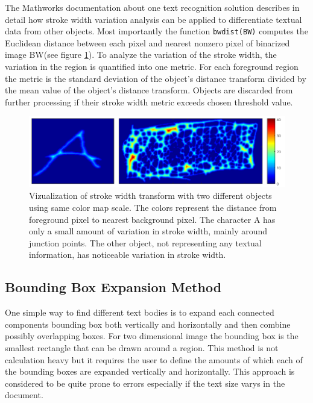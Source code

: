 \documentclass{article}
\def\code#1{\texttt{#1}}
\begin{document}
          The Mathworks documentation about one text recognition solution describes in detail how stroke width variation analysis can be applied to differentiate textual data from other objects. \cite{MathworksTextRecognition} Most importantly the function \code{bwdist(BW)} computes the Euclidean distance between each pixel and nearest nonzero pixel of binarized image BW(see figure \ref{fig:strokewidth}). To analyze the variation of the stroke width, the variation in the region is quantified into one metric. For each foreground region the metric is the standard deviation of the object's distance transform divided by the mean value of the object's distance transform. Objects are discarded from further processing if their stroke width metric exceeds chosen threshold value.

          \begin{figure}
            \centering
            \includegraphics[natwidth=863,natheight=239,scale=0.5]{strokecomparison.png}
            \caption{Vizualization of stroke width transform with two different objects using same color map scale. The colors represent the distance from foreground pixel to nearest background pixel. The character A has only a small amount of variation in stroke width, mainly around junction points. The other object, not representing any textual information, has noticeable variation in stroke width. \label{fig:strokewidth} }
          \end{figure}

        \subsection{Bounding Box Expansion Method}
          One simple way to find different text bodies is to expand each connected components bounding box both vertically and horizontally and then combine possibly overlapping boxes. For two dimensional image the bounding box is the smallest rectangle that can be drawn around a region. This method is not calculation heavy but it requires the user to define the amounts of which each of the bounding boxes are expanded vertically and horizontally. This approach is considered to be quite prone to errors especially if the text size varys in the document.
\end{document}
